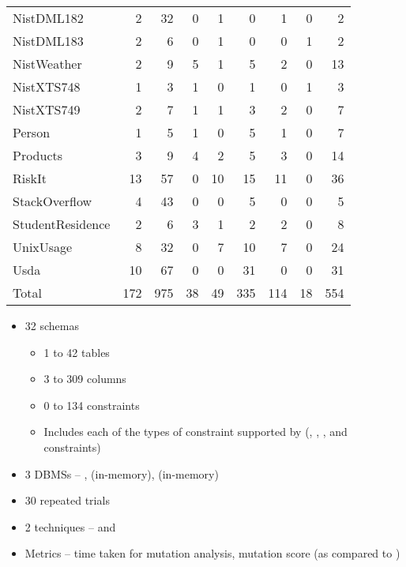 \begin{table}[t!]
{\begin{tabular}{l@{\hskip -5pt}rrrrrrrr}
				NistDML182 & 2 & 32 & 0 & 1 & 0 & 1 & 0 & 2 \\
				NistDML183 & 2 & 6 & 0 & 1 & 0 & 0 & 1 & 2 \\
				NistWeather & 2 & 9 & 5 & 1 & 5 & 2 & 0 & 13 \\
				NistXTS748 & 1 & 3 & 1 & 0 & 1 & 0 & 1 & 3 \\
				NistXTS749 & 2 & 7 & 1 & 1 & 3 & 2 & 0 & 7 \\
				Person & 1 & 5 & 1 & 0 & 5 & 1 & 0 & 7 \\
				Products & 3 & 9 & 4 & 2 & 5 & 3 & 0 & 14 \\
				RiskIt & 13 & 57 & 0 & 10 & 15 & 11 & 0 & 36 \\
				StackOverflow & 4 & 43 & 0 & 0 & 5 & 0 & 0 & 5 \\
				StudentResidence & 2 & 6 & 3 & 1 & 2 & 2 & 0 & 8 \\
				UnixUsage & 8 & 32 & 0 & 7 & 10 & 7 & 0 & 24 \\
				Usda & 10 & 67 & 0 & 0 & 31 & 0 & 0 & 31 \\
				\hline
				{Total} & 172 & 975 & 38 & 49 & 335 & 114 & 18 & 554 \\
				\hline

			\end{tabular}
		}
	\end{table}

	\begin{itemize}
		\item 32 schemas
		\begin{itemize}
			\item 1 to 42 tables
			\item 3 to 309 columns
			\item 0 to 134 constraints
			\item Includes each of the types of constraint supported by \SchemaAnalyst (\PK, \FK, \NOTNULL, \UNIQUE and \CHECK constraints)
		\end{itemize}
		\item 3 DBMSs -- \Postgres, \HyperSQL (in-memory), \SQLite (in-memory)
		\item 30 repeated trials
		\item 2 techniques -- \Original and \VirtualMutationAnalysis
		\item Metrics -- time taken for mutation analysis, mutation score (as compared to \Original)
	\end{itemize}

